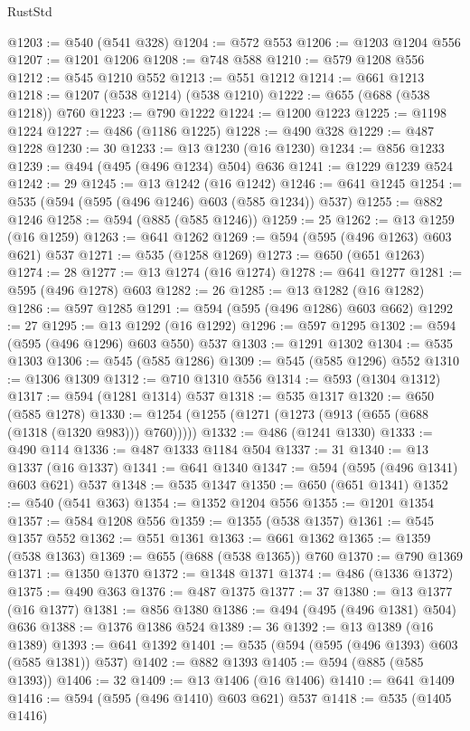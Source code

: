 \begin{lexlean}{RustStd}
\begin{coremodule}
@1203 := @540 (@541 @328)
@1204 := @572 @553
@1206 := @1203 @1204 @556
@1207 := @1201 @1206
@1208 := @748 @588
@1210 := @579 @1208 @556
@1212 := @545 @1210 @552
@1213 := @551 @1212
@1214 := @661 @1213
@1218 := @1207 (@538 @1214) (@538 @1210)
@1222 := @655 (@688 (@538 @1218)) @760
@1223 := @790 @1222
@1224 := @1200 @1223
@1225 := @1198 @1224
@1227 := @486 (@1186 @1225)
@1228 := @490 @328
@1229 := @487 @1228
@1230 := 30
@1233 := @13 @1230 (@16 @1230)
@1234 := @856 @1233
@1239 := @494 (@495 (@496 @1234) @504) @636
@1241 := @1229 @1239 @524
@1242 := 29
@1245 := @13 @1242 (@16 @1242)
@1246 := @641 @1245
@1254 := @535 (@594 (@595 (@496 @1246) @603 (@585 @1234)) @537)
@1255 := @882 @1246
@1258 := @594 (@885 (@585 @1246))
@1259 := 25
@1262 := @13 @1259 (@16 @1259)
@1263 := @641 @1262
@1269 := @594 (@595 (@496 @1263) @603 @621) @537
@1271 := @535 (@1258 @1269)
@1273 := @650 (@651 @1263)
@1274 := 28
@1277 := @13 @1274 (@16 @1274)
@1278 := @641 @1277
@1281 := @595 (@496 @1278) @603
@1282 := 26
@1285 := @13 @1282 (@16 @1282)
@1286 := @597 @1285
@1291 := @594 (@595 (@496 @1286) @603 @662)
@1292 := 27
@1295 := @13 @1292 (@16 @1292)
@1296 := @597 @1295
@1302 := @594 (@595 (@496 @1296) @603 @550) @537
@1303 := @1291 @1302
@1304 := @535 @1303
@1306 := @545 (@585 @1286)
@1309 := @545 (@585 @1296) @552
@1310 := @1306 @1309
@1312 := @710 @1310 @556
@1314 := @593 (@1304 @1312)
@1317 := @594 (@1281 @1314) @537
@1318 := @535 @1317
@1320 := @650 (@585 @1278)
@1330 := @1254 (@1255 (@1271 (@1273 (@913 (@655 (@688 (@1318 (@1320 @983))) @760)))))
@1332 := @486 (@1241 @1330)
@1333 := @490 @114
@1336 := @487 @1333 @1184 @504
@1337 := 31
@1340 := @13 @1337 (@16 @1337)
@1341 := @641 @1340
@1347 := @594 (@595 (@496 @1341) @603 @621) @537
@1348 := @535 @1347
@1350 := @650 (@651 @1341)
@1352 := @540 (@541 @363)
@1354 := @1352 @1204 @556
@1355 := @1201 @1354
@1357 := @584 @1208 @556
@1359 := @1355 (@538 @1357)
@1361 := @545 @1357 @552
@1362 := @551 @1361
@1363 := @661 @1362
@1365 := @1359 (@538 @1363)
@1369 := @655 (@688 (@538 @1365)) @760
@1370 := @790 @1369
@1371 := @1350 @1370
@1372 := @1348 @1371
@1374 := @486 (@1336 @1372)
@1375 := @490 @363
@1376 := @487 @1375
@1377 := 37
@1380 := @13 @1377 (@16 @1377)
@1381 := @856 @1380
@1386 := @494 (@495 (@496 @1381) @504) @636
@1388 := @1376 @1386 @524
@1389 := 36
@1392 := @13 @1389 (@16 @1389)
@1393 := @641 @1392
@1401 := @535 (@594 (@595 (@496 @1393) @603 (@585 @1381)) @537)
@1402 := @882 @1393
@1405 := @594 (@885 (@585 @1393))
@1406 := 32
@1409 := @13 @1406 (@16 @1406)
@1410 := @641 @1409
@1416 := @594 (@595 (@496 @1410) @603 @621) @537
@1418 := @535 (@1405 @1416)

\end{coremodule}
\end{lexlean}
